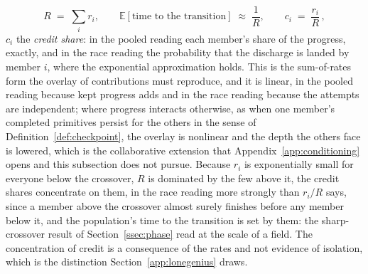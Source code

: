\documentclass{article}
\begin{document}
\begin{equation}\label{eq:netrate}
  R \;=\; \sum_i r_i, \qquad \mathbb{E}[\text{time to the transition}] \;\approx\; \frac{1}{R}, \qquad c_i \;=\; \frac{r_i}{R}\,,
\end{equation}
$c_i$ the \emph{credit share}: in the pooled reading each member's share of the progress, exactly, and in the race reading the probability that the discharge is landed by member $i$, where the exponential approximation holds. This is the sum-of-rates form the overlay of contributions must reproduce, and it is linear, in the pooled reading because kept progress adds and in the race reading because the attempts are independent; where progress interacts otherwise, as when one member's completed primitives persist for the others in the sense of Definition~\ref{def:checkpoint}, the overlay is nonlinear and the depth the others face is lowered, which is the collaborative extension that Appendix~\ref{app:conditioning} opens and this subsection does not pursue. Because $r_i$ is exponentially small for everyone below the crossover, $R$ is dominated by the few above it, the credit shares concentrate on them, in the race reading more strongly than $r_i/R$ says, since a member above the crossover almost surely finishes before any member below it, and the population's time to the transition is set by them: the sharp-crossover result of Section~\ref{ssec:phase} read at the scale of a field. The concentration of credit is a consequence of the rates and not evidence of isolation, which is the distinction Section~\ref{app:lonegenius} draws.
\end{document}
